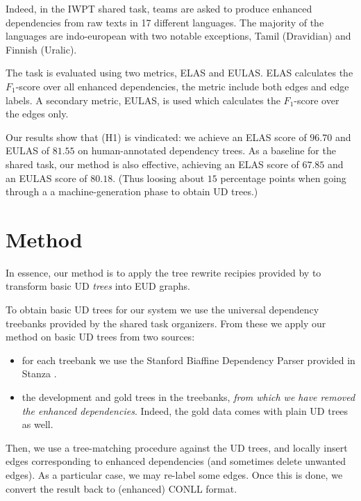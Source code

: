 \documentclass[11pt,a4paper]{article}
\begin{document}

Indeed, in the IWPT shared task, teams are asked to produce enhanced
dependencies from raw texts in 17 different languages. The
majority of the languages are indo-european with two notable
exceptions, Tamil (Dravidian) and Finnish (Uralic).

The task is evaluated using two metrics, ELAS and EULAS. ELAS
calculates the $F_1$-score over all enhanced dependencies, the
metric include both edges and edge labels. A secondary metric,
EULAS, is used which calculates the $F_1$-score over the edges
only.


Our results show that (H1) is vindicated: we achieve an ELAS score of
$96.70$ and EULAS of $81.55$ on human-annotated dependency trees.  As
a baseline for the shared task, our method is also effective,
achieving an ELAS score of $67.85$ and an EULAS score of
$80.18$. (Thus loosing about $15$ percentage points when going through
a a machine-generation phase to obtain UD trees.)

\section{Method}
In essence, our method is to apply the tree rewrite recipies
provided by \citet{schuster2016enhanced} to transform basic UD
\emph{trees} into EUD graphs.

To obtain basic UD trees for our system we use the universal
dependency treebanks provided by the shared task organizers. From
these we apply our method on basic UD trees from two sources:
\begin{itemize}
\item for each treebank we use the Stanford Biaffine Dependency
Parser \citep{dozat2016deep} provided in Stanza
\citep{qi2020stanza}.
\item the development and gold trees in the treebanks, \emph{from
    which we have removed the enhanced dependencies}. Indeed, the gold
  data comes with plain UD trees as well.
\end{itemize}

Then, we use a tree-matching procedure against the UD trees, and
locally insert edges corresponding to enhanced dependencies (and
sometimes delete unwanted edges). As a particular case, we may
re-label some edges. Once this is done, we convert the result back to
(enhanced) CONLL format.
\end{document}
